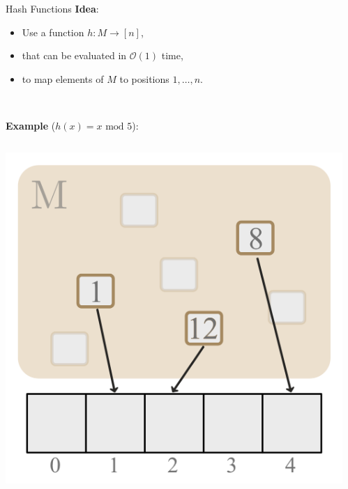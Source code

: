 \documentclass[10pt]{beamer}
\begin{document}
\begin{frame}[fragile]{Hash Functions}
    \textbf{Idea}:
    \vspace{-.75em}
    \begin{itemize}
        \item Use a function $ h : M \to [n] $, \pause
        \item that can be evaluated in $ \mathcal{O}(1) $ time,\pause
        \item to map elements of $ M $ to positions $ 1, \dots, n $. \pause
    \end{itemize}
    \\
    \vfill

    \textbf{Example} ($ h(x) = x \text{ mod } 5 $):
    \begin{columns}[T]
    \begin{column}{.3\textwidth}
        \includegraphics[height=.5\textheight]{Images/Hashing/Hashing_01}
    \end{column}

    \begin{column}{.5\textwidth}
    \end{column}
    \end{columns}

\end{frame}
\end{document}
